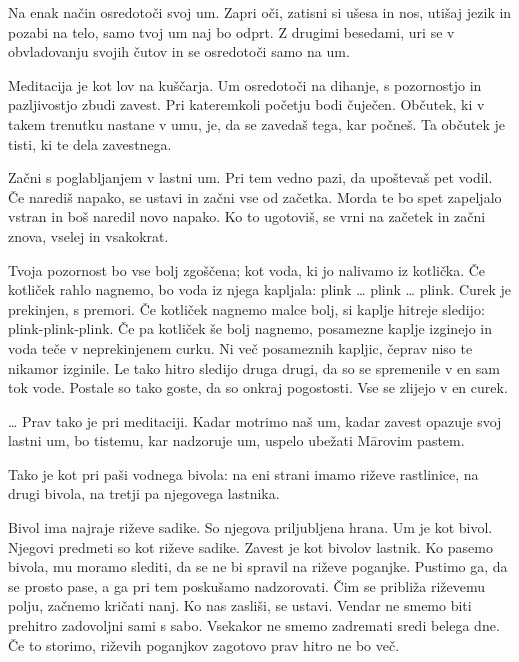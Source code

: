 Na enak način osredotoči svoj um. Zapri oči, zatisni si ušesa in nos, utišaj jezik in pozabi na telo, samo tvoj um naj bo odprt. Z drugimi besedami, uri se v obvladovanju svojih čutov in se osredotoči samo na um.

Meditacija je kot lov na kuščarja. Um osredotoči na dihanje, s pozornostjo in pazljivostjo zbudi zavest. Pri kateremkoli početju bodi čuječen. Občutek, ki v takem trenutku nastane v umu, je, da se zavedaš tega, kar počneš. Ta občutek je tisti, ki te dela zavestnega.

\clearpage


Začni s poglabljanjem v lastni um. Pri tem vedno pazi, da upoštevaš pet vodil. Če narediš napako, se ustavi in začni vse od začetka. Morda te bo spet zapeljalo vstran in boš naredil novo napako. Ko to ugotoviš, se vrni na začetek in začni znova, vselej in vsakokrat.

Tvoja pozornost bo vse bolj zgoščena; kot voda, ki jo nalivamo iz kotlička. Če kotliček rahlo nagnemo, bo voda iz njega kapljala: plink \ldots{} plink \ldots{} plink. Curek je prekinjen, s premori. Če kotliček nagnemo malce bolj, si kaplje hitreje sledijo: plink-plink-plink. Če pa kotliček še bolj nagnemo, posamezne kaplje izginejo in voda teče v neprekinjenem curku. Ni več posameznih kapljic, čeprav niso te nikamor izginile. Le tako hitro sledijo druga drugi, da so se spremenile v en sam tok vode. Postale so tako goste, da so onkraj pogostosti. Vse se zlijejo v en curek.

\clearpage


\ldots{} Prav tako je pri meditaciji. Kadar motrimo naš um, kadar zavest opazuje svoj lastni um, bo tistemu, kar nadzoruje um, uspelo ubežati Mārovim pastem.

Tako je kot pri paši vodnega bivola: na eni strani imamo riževe rastlinice, na drugi bivola, na tretji pa njegovega lastnika.

Bivol ima najraje riževe sadike. So njegova priljubljena hrana. Um je kot bivol. Njegovi predmeti so kot riževe sadike. Zavest je kot bivolov lastnik. Ko pasemo bivola, mu moramo slediti, da se ne bi spravil na riževe poganjke. Pustimo ga, da se prosto pase, a ga pri tem poskušamo nadzorovati. Čim se približa riževemu polju, začnemo kričati nanj. Ko nas zasliši, se ustavi. Vendar ne smemo biti prehitro zadovoljni sami s sabo. Vsekakor ne smemo zadremati sredi belega dne. Če to storimo, riževih poganjkov zagotovo prav hitro ne bo več.

